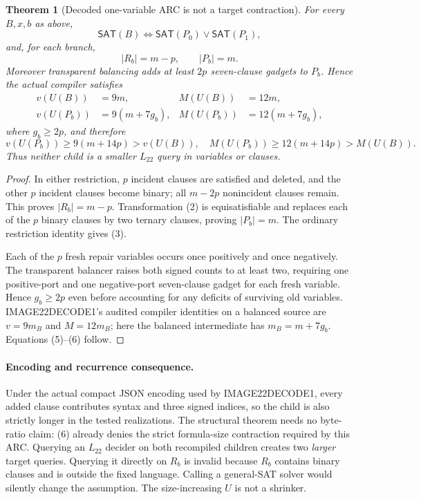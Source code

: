 \documentclass[11pt]{article}
\newtheorem{theorem}{Theorem}
\newcommand{\SAT}{\mathsf{SAT}}
\begin{document}
\begin{theorem}[Decoded one-variable ARC is not a target contraction]
For every $B,x,b$ as above,
\[
 \SAT(B)\Longleftrightarrow \SAT(P_0)\lor\SAT(P_1),          \tag{3}
\]
and, for each branch,
\[
 |R_b|=m-p,\qquad |P_b|=m.                                  \tag{4}
\]
Moreover transparent balancing adds at least $2p$ seven-clause gadgets to
$P_b$.  Hence the actual compiler satisfies
\[
 \begin{aligned}
 v(U(B))&=9m,& M(U(B))&=12m,\\
 v(U(P_b))&=9(m+7g_b),&M(U(P_b))&=12(m+7g_b),
 \end{aligned}                                               \tag{5}
\]
where $g_b\ge2p$, and therefore
\[
 v(U(P_b))\ge9(m+14p)>v(U(B)),\quad
 M(U(P_b))\ge12(m+14p)>M(U(B)).                              \tag{6}
\]
Thus neither child is a smaller $L_{22}$ query in variables or clauses.
\end{theorem}

\begin{proof}
In either restriction, $p$ incident clauses are satisfied and deleted, and
the other $p$ incident clauses become binary; all $m-2p$ nonincident clauses
remain.  This proves $|R_b|=m-p$.  Transformation (2) is equisatisfiable and
replaces each of the $p$ binary clauses by two ternary clauses, proving
$|P_b|=m$.  The ordinary restriction identity gives (3).

Each of the $p$ fresh repair variables occurs once positively and once
negatively.  The transparent balancer raises both signed counts to at least
two, requiring one positive-port and one negative-port seven-clause gadget
for each fresh variable.  Hence $g_b\ge2p$ even before accounting for any
deficits of surviving old variables.  IMAGE22DECODE1's audited compiler
identities on a balanced source are $v=9m_B$ and $M=12m_B$; here the balanced
intermediate has $m_B=m+7g_b$.  Equations (5)--(6) follow.
\end{proof}

\paragraph{Encoding and recurrence consequence.}
Under the actual compact JSON encoding used by IMAGE22DECODE1, every added
clause contributes syntax and three signed indices, so the child is also
strictly longer in the tested realizations.  The structural theorem needs no
byte-ratio claim: (6) already denies the strict formula-size contraction
required by this ARC.  Querying an $L_{22}$ decider on both recompiled
children creates two \emph{larger} target queries.  Querying it directly on
$R_b$ is invalid because $R_b$ contains binary clauses and is outside the
fixed language.  Calling a general-SAT solver would silently change the
assumption.  The size-increasing $U$ is not a shrinker.
\end{document}
